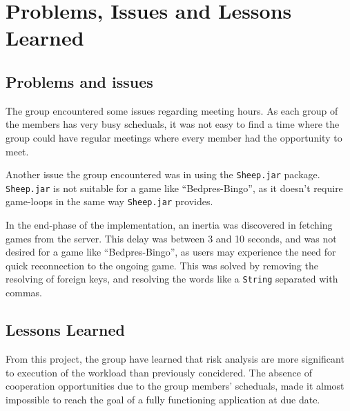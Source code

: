 \section{Problems, Issues and Lessons Learned}
\label{sec:issues}

\subsection{Problems and issues}
The group encountered some issues regarding meeting hours. As each group
of the members has very busy scheduals, it was not easy to find a time where the group could have regular meetings where every member
had the opportunity to meet.

Another issue the group encountered
was in using the \texttt{Sheep.jar} package. \texttt{Sheep.jar} is not
suitable for a game like ``Bedpres-Bingo'', as it doesn't require game-loops in the same way \texttt{Sheep.jar} provides.

In the end-phase of the implementation, an inertia was discovered in
fetching games from the server. This delay was between 3 and 10 seconds,
and was not desired for a game like ``Bedpres-Bingo'', as users may
experience the need for quick reconnection to the ongoing game. This was solved by removing the resolving of foreign keys, and resolving the words like a \texttt{String} separated with commas.

\subsection{Lessons Learned}
From this project, the group have learned that risk analysis are more
significant to execution of the workload than previously concidered.
The absence of cooperation opportunities due to the group members' scheduals,
made it almost impossible to reach the goal of a fully functioning application
at due date.